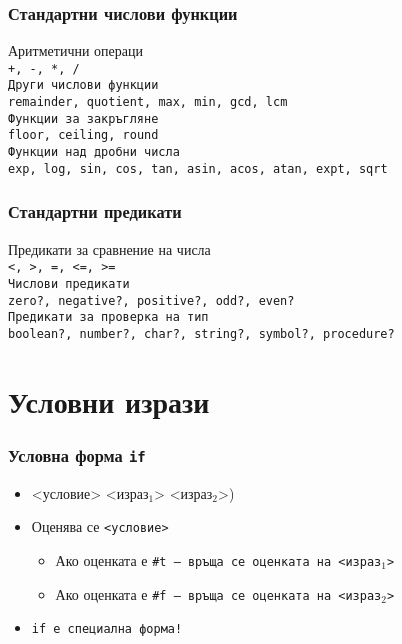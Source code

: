 \documentclass{beamer}
\begin{document}
\begin{frame}
  \frametitle{Стандартни числови функции}

  Аритметични операци\\
  \tt{+}, \tt{-}, \tt{*}, \tt{/}\\[1em]
  Други числови функции\\
  \tt{remainder}, \tt{quotient}, \tt{max}, \tt{min}, \tt{gcd}, \tt{lcm}\\[1em]
  Функции за закръгляне\\
  \tt{floor}, \tt{ceiling}, \tt{round}\\[1em]
  Функции над дробни числа\\
  \tt{exp}, \tt{log}, \tt{sin}, \tt{cos}, \tt{tan}, \tt{asin}, \tt{acos}, \tt{atan}, \tt{expt}, \tt{sqrt}
\end{frame}

\begin{frame}
  \frametitle{Стандартни предикати}

  Предикати за сравнение на числа\\
  \tt{<}, \tt{>}, \tt{=}, \tt{<=}, \tt{>=}\\[1em]
  Числови предикати\\
  \tt{zero?}, \tt{negative?}, \tt{positive?}, \tt{odd?}, \tt{even?}\\[1em]
  Предикати за проверка на тип\\
  \tt{boolean?}, \tt{number?}, \tt{char?}, \tt{string?}, \tt{symbol?}, \tt{procedure?}
\end{frame}

\section{Условни изрази}

\begin{frame}
  \frametitle{Условна форма \tt{if}}

  \begin{itemize}[<+->]
  \item {} <условие> <израз$_1$> <израз$_2$>\tta)
  \item Оценява се \tt{<условие>}
    \begin{itemize}
    \item Ако оценката е \tt{\#t} --- връща се оценката на <израз$_1$>
    \item Ако оценката е \tt{\#f} --- връща се оценката на <израз$_2$>
    \end{itemize}
  \item \alert{\tt{if} е специална форма!}
  \end{itemize}
\end{frame}
\end{document}
